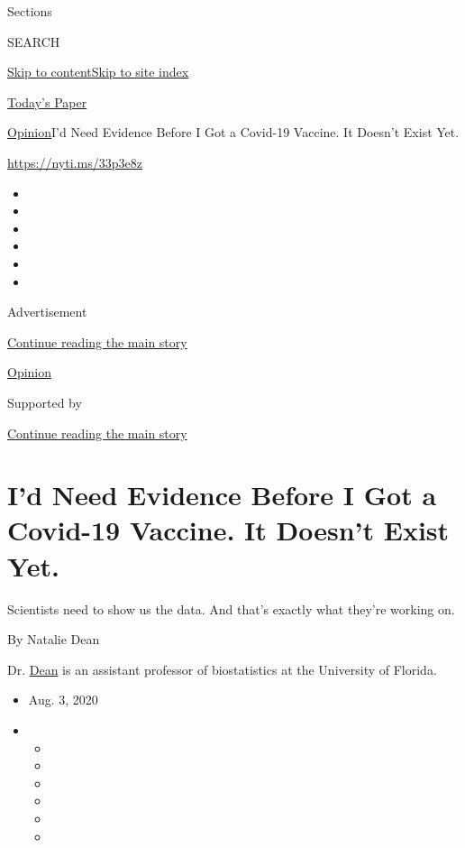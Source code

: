 Sections

SEARCH

\protect\hyperlink{site-content}{Skip to
content}\protect\hyperlink{site-index}{Skip to site index}

\href{https://myaccount.nytimes.com/auth/login?response_type=cookie\&client_id=vi}{}

\href{https://www.nytimes.com/section/todayspaper}{Today's Paper}

\href{/section/opinion}{Opinion}\textbar{}I'd Need Evidence Before I Got
a Covid-19 Vaccine. It Doesn't Exist Yet.

\url{https://nyti.ms/33p3e8z}

\begin{itemize}
\item
\item
\item
\item
\item
\item
\end{itemize}

Advertisement

\protect\hyperlink{after-top}{Continue reading the main story}

\href{/section/opinion}{Opinion}

Supported by

\protect\hyperlink{after-sponsor}{Continue reading the main story}

\hypertarget{id-need-evidence-before-i-got-a-covid-19-vaccine-it-doesnt-exist-yet}{%
\section{I'd Need Evidence Before I Got a Covid-19 Vaccine. It Doesn't
Exist
Yet.}\label{id-need-evidence-before-i-got-a-covid-19-vaccine-it-doesnt-exist-yet}}

Scientists need to show us the data. And that's exactly what they're
working on.

By Natalie Dean

Dr. \href{https://www.nataliexdean.com/}{Dean} is an assistant professor
of biostatistics at the University of Florida.

\begin{itemize}
\item
  Aug. 3, 2020
\item
  \begin{itemize}
  \item
  \item
  \item
  \item
  \item
  \item
  \end{itemize}
\end{itemize}

